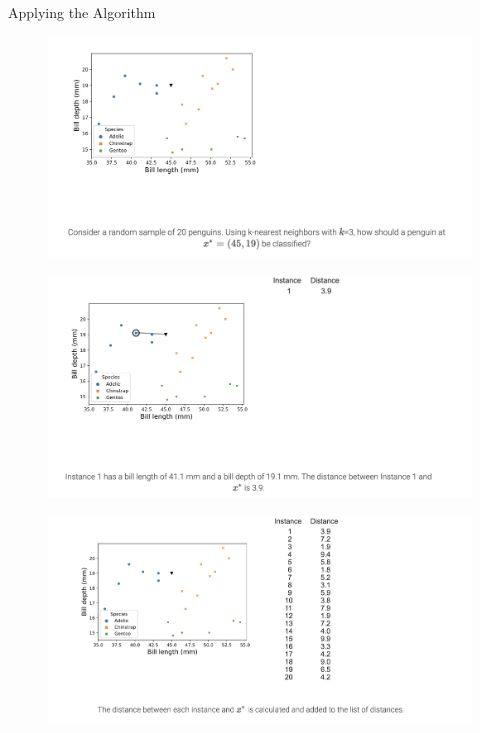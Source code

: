 \documentclass[8pt,dvipsnames]{beamer}
\begin{document}
\begin{frame}{Applying the Algorithm}
	\begin{figure}[ht]
		\centering
		\includegraphics[width=\linewidth]{imgs/knn_9.png}
	\end{figure}
\end{frame}

\begin{frame}
	\begin{figure}[ht]
		\centering
		\includegraphics[width=\linewidth]{imgs/knn_10.png}
	\end{figure}
\end{frame}

\begin{frame}
	\begin{figure}[ht]
		\centering
		\includegraphics[width=\linewidth]{imgs/knn_11.png}
	\end{figure}
\end{frame}
\end{document}
